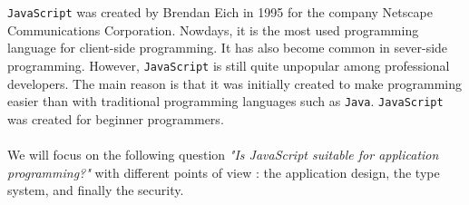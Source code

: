 \texttt{JavaScript} was created by Brendan Eich in 1995 for the company Netscape Communications Corporation. Nowdays, it is the most used programming language for client-side programming. It has also become common in sever-side programming. However, \texttt{JavaScript} is still quite unpopular among professional developers. The main reason is that it was initially created to make programming easier than with traditional programming languages such as \texttt{Java}. \texttt{JavaScript} was created for beginner programmers.
\paragraph{}
We will focus on the following question \emph{"Is JavaScript suitable for application programming?"} with different points of view : the application design, the type system, and finally the security. 
